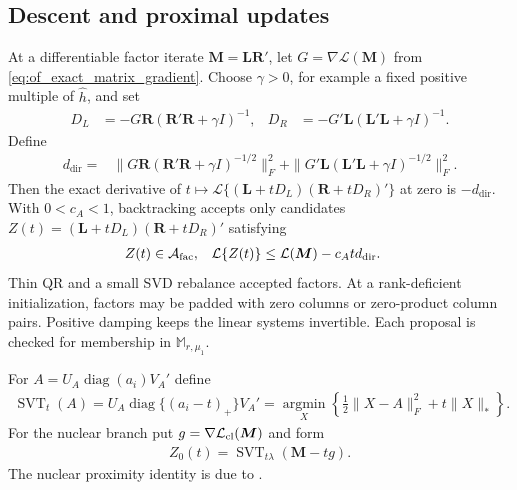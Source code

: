\documentclass[numsec,webpdf,modern,large,namedate]{oup-authoring-template}
\theoremstyle{plain}
\theoremstyle{remark}
\newcommand{\M}{\bm{M}}
\newcommand{\bL}{\bm{L}}
\newcommand{\R}{\bm{R}}
\newif\ifmarkchanges
\newenvironment{revision}{\begingroup\ifmarkchanges\color{red}\fi}{\endgroup}
\begin{document}
\begin{revision}
\subsection{Descent and proximal updates}
\label{sec:descent_updates}
At a differentiable factor iterate $\M=\bL\R'$, let
$G=\nabla\mathcal L(\M)$ from
\eqref{eq:of_exact_matrix_gradient}.  Choose $\gamma>0$, for example a
fixed positive multiple of $\widehat h$, and set
\begin{align}
 D_L&=-G\R(\R'\R+\gamma I)^{-1},&
 D_R&=-G'\bL(\bL'\bL+\gamma I)^{-1}.
 \label{eq:of_factor_direction}
\end{align}
Define
\begin{align}
 d_{\mathrm{dir}}={}&
 \|G\R(\R'\R+\gamma I)^{-1/2}\|_F^2
 +\|G'\bL(\bL'\bL+\gamma I)^{-1/2}\|_F^2.
 \label{eq:of_factor_decrement}
\end{align}
Then the exact derivative of
$t\mapsto\mathcal L\{(\bL+tD_L)(\R+tD_R)'\}$ at zero is
$-d_{\mathrm{dir}}$.  With $0<c_A<1$, backtracking accepts only candidates
$Z(t)=(\bL+tD_L)(\R+tD_R)'$ satisfying
\begin{align}
 Z(t)&\in\mathcal A_{\rm fac},&
 \mathcal L\{Z(t)\}&\le\mathcal L(\M)-c_A td_{\mathrm{dir}}.
 \label{eq:of_factor_armijo}
\end{align}
Thin QR and a small SVD rebalance accepted factors. At a rank-deficient
initialization, factors may be padded with zero columns or zero-product
column pairs. Positive damping keeps the linear systems invertible.
Each proposal is checked for membership in $\mathbb M_{r,\mu_1}$.

For $A=U_A\operatorname{diag}(a_i)V_A'$ define
\begin{align}
 \operatorname{SVT}_t(A)
 =U_A\operatorname{diag}\{(a_i-t)_+\}V_A'
 =\operatorname*{argmin}_X
 \left\{\tfrac12\|X-A\|_F^2+t\|X\|_*\right\}.
 \label{eq:svt_definition}
\end{align}
For the nuclear branch put $g=\nabla\mathcal L_{\rm cl}(\M)$ and form
\begin{align}
 Z_0(t)=\operatorname{SVT}_{t\lambda}(\M-tg).
 \label{eq:of_plain_nuclear_prox}
\end{align}
The nuclear proximity identity is due to \cite{cai2010singular}.


\end{revision}
\end{document}
